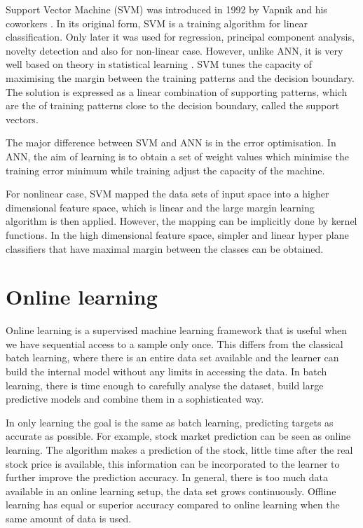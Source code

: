 Support Vector Machine (SVM) was introduced in 1992 by Vapnik and his coworkers
\cite{boser1992}. In its original form, SVM is a training algorithm for linear classification. Only later it was used for regression, principal component analysis, novelty detection and also for non-linear case.  However, unlike ANN, it is very well 
based on theory in statistical learning \cite{cortes1995}.  SVM tunes the capacity of 
maximising the margin between the training patterns and the decision boundary. The
solution is expressed as a linear combination of supporting patterns, which are the 
of training patterns close to the decision boundary, called the support vectors.

The major difference between SVM and ANN is in the error optimisation. In ANN, the aim of learning is to obtain a set of weight values which minimise the training error 
minimum while training adjust the capacity of the machine. 

For nonlinear case, SVM mapped the data sets of input space into a higher dimensional feature space, which is linear and the large margin learning algorithm is then applied. However, the mapping can be implicitly done by kernel functions. In the high dimensional feature space, simpler and linear hyper plane classifiers that have maximal margin between the classes can be obtained.


\section{Online learning} \label{sec:onoffline}

Online learning is a supervised machine learning framework that is useful when we have sequential access to a sample only once.  This differs from the classical batch learning, where there is an entire data set available and the learner can build the internal model without any limits in accessing the data. In batch learning, there is time enough to carefully analyse the dataset, build large predictive models and combine them in a sophisticated way. 

In only learning the goal is the same as batch learning, predicting targets as accurate as possible. For example, stock market prediction can be seen as online learning. The algorithm makes a prediction of the stock, little time after the real stock price is available, this information can be incorporated to the learner to further improve the prediction accuracy. In general, there is too much data available in an online learning setup, the data set grows continuously. Offline learning has equal or superior accuracy compared to online learning when the same amount of data is used.

